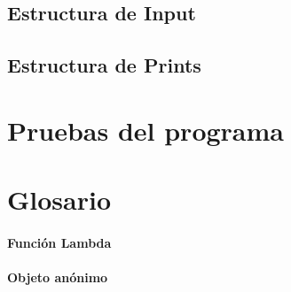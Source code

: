 \documentclass[a4paper]{article}
\begin{document}
    \subsection{Estructura de Input}
    
    \subsection{Estructura de Prints}
    

\section{Pruebas del programa}

\section{Glosario}
\paragraph{Función Lambda}

\paragraph{Objeto anónimo}


\end{document}
